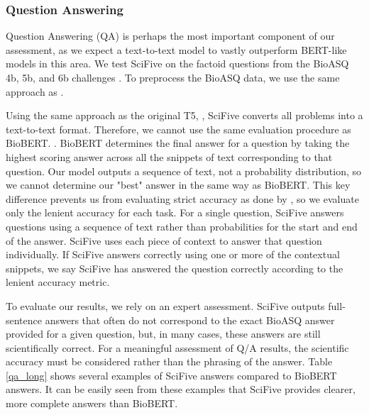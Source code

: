 \documentclass[nocrop]{bioinfo}
\begin{document}
\subsubsection{Question Answering}
Question Answering (QA) is perhaps the most important component of our assessment, as we expect a text-to-text model to vastly outperform BERT-like models in this area. We test SciFive on the factoid questions from the BioASQ 4b, 5b, and 6b challenges \cite{article_bioasq}. To preprocess the BioASQ data, we use the same approach as \cite{DBLP:journals/corr/abs-1901-08746}. 

Using the same approach as the original T5, \citep{DBLP:journals/corr/abs-1910-10683}, SciFive converts all problems into a text-to-text format. Therefore, we cannot use the same evaluation procedure as BioBERT. \citep{DBLP:journals/corr/abs-1901-08746}. BioBERT determines the final answer for a question by taking the highest scoring answer across all the snippets of text corresponding to that question. Our model outputs a sequence of text, not a probability distribution, so we cannot determine our "best" answer in the same way as BioBERT. This key difference prevents us from evaluating strict accuracy as done by \cite{DBLP:journals/corr/abs-1901-08746}, so we evaluate only the lenient accuracy for each task. For a single question, SciFive answers questions using a sequence of text rather than probabilities for the start and end of the answer. SciFive uses each piece of context to answer that question individually. If SciFive answers correctly using one or more of the contextual snippets, we say SciFive has answered the question correctly according to the lenient accuracy metric.
 
 To evaluate our results, we rely on an expert assessment. SciFive outputs full-sentence answers that often do not correspond to the exact BioASQ answer provided for a given question, but, in many cases, these answers are still scientifically correct. For a meaningful  assessment of Q/A results, the scientific accuracy must be considered rather than the phrasing of the answer. Table \ref{qa_long} shows several examples of SciFive answers compared to BioBERT answers. It can be easily seen from these examples that SciFive provides clearer, more complete answers than BioBERT.
\end{document}
